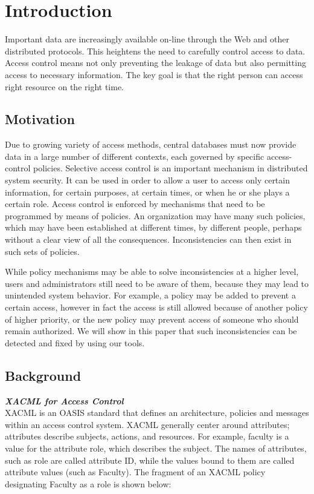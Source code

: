 \documentclass{acm_proc_article-sp}
\begin{document}
\section{Introduction}

Important data are increasingly available on-line through the Web and other distributed protocols. This heightens the need to carefully control access to data. Access control means not only preventing the leakage of data but also permitting access to necessary information. The key goal is that the right person can access right resource on the right time.

\subsection{Motivation}

Due to growing variety of access methods, central databases must now provide data in a
large number of different contexts, each governed by specific access-control policies. Selective access control is an important mechanism in distributed system security. It can be used in order to allow a user to access only certain information, for certain purposes, at certain times, or when he or she plays a certain role. Access control is enforced by mechanisms that need to be programmed by means of policies. An organization may have many such policies, which may have been established at different times, by different people, perhaps without a clear view of all the consequences. Inconsistencies can then exist in such sets of policies. 

While policy mechanisms may be able to solve inconsistencies at a higher level, users and administrators still need to be aware of them, because they may lead to unintended system behavior. For example, a policy may be added to prevent a certain access, however in fact the access is still allowed because of another policy of higher priority, or the new policy may prevent access of someone who should remain authorized. We will show in this paper that such inconsistencies can be detected and fixed by using our tools.

\subsection{Background}


\textbf{\emph{XACML for Access Control}}\\
XACML is an OASIS standard that defines an architecture, policies and messages within an access control system. XACML generally center around attributes; attributes describe subjects, actions, and resources. For example, faculty is a value for the attribute role, which describes the subject. The names of attributes, such as role are called attribute ID, while the values bound
to them are called attribute values  (such as Faculty). The fragment of an XACML policy designating Faculty as a role is shown below:\\
\end{document}
